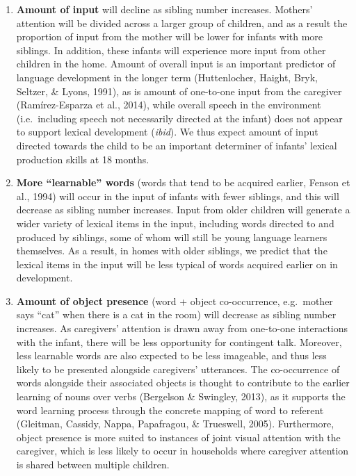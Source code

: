 \documentclass[
  english,
  man,floatsintext]{apa6}
\begin{document}
\begin{enumerate}
\def\labelenumi{\arabic{enumi})}
\item
  \textbf{Amount of input} will decline as sibling number increases. Mothers' attention will be divided across a larger group of children, and as a result the proportion of input from the mother will be lower for infants with more siblings. In addition, these infants will experience more input from other children in the home. Amount of overall input is an important predictor of language development in the longer term (Huttenlocher, Haight, Bryk, Seltzer, \& Lyons, 1991), as is amount of one-to-one input from the caregiver (Ramírez-Esparza et al., 2014), while overall speech in the environment (i.e.~including speech not necessarily directed at the infant) does not appear to support lexical development (\emph{ibid}). We thus expect amount of input directed towards the child to be an important determiner of infants' lexical production skills at 18 months.
\item
  \textbf{More \enquote{learnable} words} (words that tend to be acquired earlier, Fenson et al., 1994) will occur in the input of infants with fewer siblings, and this will decrease as sibling number increases. Input from older children will generate a wider variety of lexical items in the input, including words directed to and produced by siblings, some of whom will still be young language learners themselves. As a result, in homes with older siblings, we predict that the lexical items in the input will be less typical of words acquired earlier on in development.
\item
  \textbf{Amount of object presence} (word + object co-occurrence, e.g.~mother says \enquote{cat} when there is a cat in the room) will decrease as sibling number increases. As caregivers' attention is drawn away from one-to-one interactions with the infant, there will be less opportunity for contingent talk. Moreover, less learnable words are also expected to be less imageable, and thus less likely to be presented alongside caregivers' utterances. The co-occurrence of words alongside their associated objects is thought to contribute to the earlier learning of nouns over verbs (Bergelson \& Swingley, 2013), as it supports the word learning process through the concrete mapping of word to referent (Gleitman, Cassidy, Nappa, Papafragou, \& Trueswell, 2005). Furthermore, object presence is more suited to instances of joint visual attention with the caregiver, which is less likely to occur in households where caregiver attention is shared between multiple children.
\end{enumerate}
\end{document}
